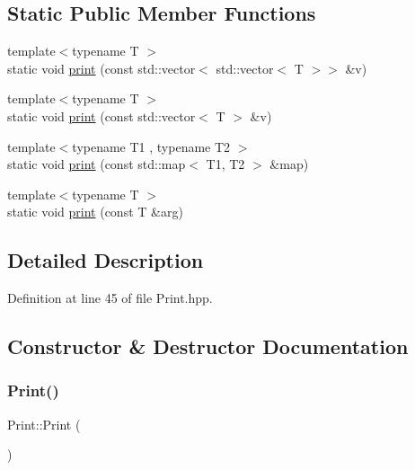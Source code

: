 \subsection*{Static Public Member Functions}
\begin{DoxyCompactItemize}
\item 
{\footnotesize template$<$typename T $>$ }\\static void \mbox{\hyperlink{class_print_ac634af53bf8c46bf58a8e538d883507d}{print}} (const std\+::vector$<$ std\+::vector$<$ T $>$$>$ \&v)
\item 
{\footnotesize template$<$typename T $>$ }\\static void \mbox{\hyperlink{class_print_a25829c4ccba037ef74becfa62d6df8e6}{print}} (const std\+::vector$<$ T $>$ \&v)
\item 
{\footnotesize template$<$typename T1 , typename T2 $>$ }\\static void \mbox{\hyperlink{class_print_a05c6cdd69d5464717dd309970a137dc9}{print}} (const std\+::map$<$ T1, T2 $>$ \&map)
\item 
{\footnotesize template$<$typename T $>$ }\\static void \mbox{\hyperlink{class_print_ad4e13f34dafb98c6c3591a45c620181a}{print}} (const T \&arg)
\end{DoxyCompactItemize}


\subsection{Detailed Description}


Definition at line 45 of file Print.\+hpp.



\subsection{Constructor \& Destructor Documentation}
\mbox{\label{class_print_a84154f9ef258a6e0d061c049d2cd430f}} 
\subsubsection{\texorpdfstring{Print()}{Print()}}
{\footnotesize\ttfamily Print\+::\+Print (\begin{DoxyParamCaption}{ }\end{DoxyParamCaption})\hspace{0.3cm}{\ttfamily [default]}}

